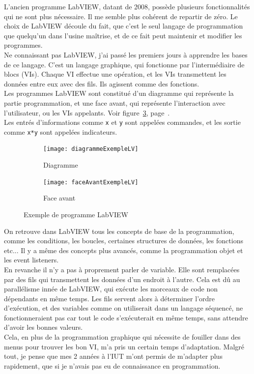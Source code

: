 \documentclass[12pt]{article}
\begin{document}
L'ancien programme LabVIEW, datant de 2008, possède plusieurs fonctionnalités qui ne sont plus nécessaire.
Il me semble plus cohérent de repartir de zéro.
Le choix de LabVIEW découle du fait, que c'est le seul langage de programmation que quelqu'un dans l'usine maîtrise, et de ce fait peut maintenir et modifier les programmes.\\
Ne connaissant pas LabVIEW, j'ai passé les premiers jours à apprendre les bases de ce langage.
C'est un langage graphique, qui fonctionne par l'intermédiaire de blocs (VIs).
Chaque VI effectue une opération, et les VIs transmettent les données entre eux avec des fils.
Ils agissent comme des fonctions.\\
Les programmes LabVIEW sont constitué d'un diagramme qui représente la partie programmation, et une face avant, qui représente l'interaction avec l'utilisateur, ou les VIs appelants.
Voir figure~\ref{fig:exempleLabVIEW}, page~\pageref{fig:exempleLabVIEW}.\\
Les entrés d'informations comme \verb|x| et \verb|y| sont appelées commandes, et les sortie comme \verb|x*y| sont appelées indicateurs.\\
\begin{figure}[H]
	\begin{subfigure}{0.5\textwidth}
		\centering
		\texttt{[image: diagrammeExempleLV]}
		\caption{Diagramme}
		\label{fig:exempleDiagramme}
	\end{subfigure}
	\begin{subfigure}{0.5\textwidth}
		\centering
		\texttt{[image: faceAvantExempleLV]}
		\caption{Face avant}
		\label{fig:exempleFaceAvant}
	\end{subfigure}

	\caption{Exemple de programme LabVIEW}
	\label{fig:exempleLabVIEW}
\end{figure}
On retrouve dans LabVIEW tous les concepts de base de la programmation, comme les conditions, les boucles, certaines structures de données, les fonctions etc...
Il y a même des concepts plus avancés, comme la programmation objet et les event listeners.\\
En revanche il n'y a pas à proprement parler de variable.
Elle sont remplacées par des fils qui transmettent les données d'un endroit à l'autre.
Cela est dû au parallélisme innée de LabVIEW, qui exécute les morceaux de code non dépendants en même temps.
Les fils servent alors à déterminer l'ordre d'exécution, et des variables comme on utiliserait dans un langage séquencé, ne fonctionneraient pas car tout le code s'exécuterait en même temps, sans attendre d'avoir les bonnes valeurs.\\
Cela, en plus de la programmation graphique qui nécessite de fouiller dans des menus pour trouver les bon VI, m'a pris un certain temps d'adaptation.
Malgré tout, je pense que mes 2 années à l'IUT m'ont permis de m'adapter plus rapidement, que si je n'avais pas eu de connaissance en programmation.
\end{document}
